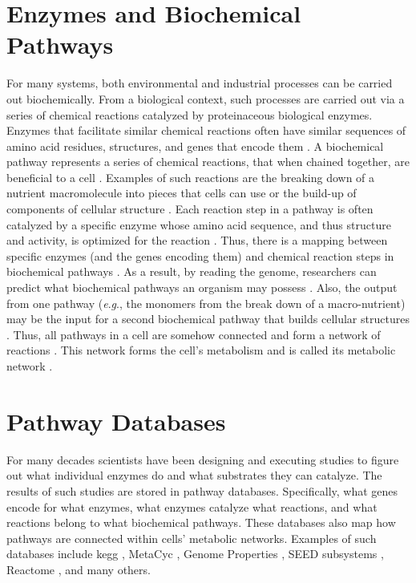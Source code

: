 \section{Enzymes and Biochemical Pathways} \label{enzymes-and-pathways} 

For many systems, both environmental and industrial processes can be carried out 
biochemically. From a biological context, such processes are carried out via a 
series of chemical reactions catalyzed by proteinaceous biological enzymes. 
Enzymes that facilitate similar chemical reactions often 
\cite{galperin1998analogous} have similar sequences of amino acid residues, 
structures, and genes that encode them \cite{zhang2003evolution}. A biochemical 
pathway represents a series of chemical reactions, that when chained together, 
are beneficial to a cell \cite{michal2012biochemical}. Examples of such 
reactions are the breaking down of a nutrient macromolecule into pieces that 
cells can use or the build-up of components of cellular structure 
\cite{wagner2012metabolic}. Each reaction step in a pathway is often 
\cite{keller2015widespread,tawfik2010enzyme} catalyzed by a specific enzyme 
whose amino acid sequence, and thus structure and activity, is optimized for the 
reaction \cite{michal2012biochemical,zhang2003evolution,fersht1999structure}. 
Thus, there is a mapping between specific enzymes (and the genes encoding them) 
and chemical reaction steps in biochemical pathways \cite{thiele2010protocol}. 
As a result, by reading the genome, researchers can predict what biochemical 
pathways an organism may possess 
\cite{abubucker2012metabolic,thiele2010protocol}. Also, the output from one 
pathway (\textit{e}.\textit{g}., the monomers from the break down of a macro-nutrient) may be the 
input for a second biochemical pathway that builds cellular structures 
\cite{wagner2012metabolic,stelling2002metabolic}. Thus, all pathways in a cell 
are somehow connected and form a network of reactions 
\cite{wagner2012metabolic,stelling2002metabolic}. This network forms the cell's 
metabolism and is called its metabolic network \cite{wagner2012metabolic}.

\section{Pathway Databases} \label{pathway-databases}

For many decades scientists have been designing and executing studies to figure 
out what individual enzymes do and what substrates they can catalyze. The 
results of such studies are stored in pathway databases. Specifically, what 
genes encode for what enzymes, what enzymes catalyze what reactions, and what 
reactions belong to what biochemical pathways. These databases also map how 
pathways are connected within cells' metabolic networks. Examples of such 
databases include \gls{kegg} \cite{kanehisa2000kegg}, MetaCyc 
\cite{karp2002metacyc}, Genome Properties \cite{richardson2018genome}, SEED 
subsystems \cite{overbeek2005subsystems}, Reactome \cite{croft2013reactome}, and 
many others.

